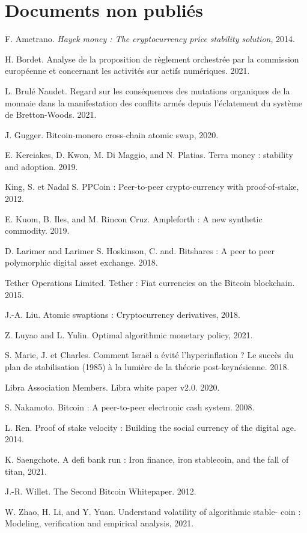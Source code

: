 {\section*{Documents non publiés}
F. Ametrano. \emph{Hayek money : The cryptocurrency price stability solution}, 2014.\par
H. Bordet. Analyse de la proposition de règlement orchestrée par la commission européenne et concernant les activités sur actifs numériques. 2021.\par
L. Brulé Naudet. Regard sur les conséquences des mutations organiques de la monnaie dans la manifestation des conflits armés depuis l'éclatement du système de Bretton-Woods. 2021.\par
J. Gugger. Bitcoin-monero cross-chain atomic swap, 2020.\par
E. Kereiakes, D. Kwon, M. Di Maggio, and N. Platias. Terra money : stability and adoption. 2019.\par
King, S. et Nadal S. PPCoin : Peer-to-peer crypto-currency with proof-of-stake, 2012.\par
E. Kuom, B. Iles, and M. Rincon Cruz. Ampleforth : A new synthetic commodity. 2019.\par
D. Larimer and Larimer S. Hoskinson, C. and. Bitshares : A peer to peer polymorphic digital asset exchange. 2018.\par
Tether Operations Limited. Tether : Fiat currencies on the Bitcoin blockchain. 2015.\par
J.-A. Liu. Atomic swaptions : Cryptocurrency derivatives, 2018.\par
Z. Luyao and L. Yulin. Optimal algorithmic monetary policy, 2021.\par
S. Marie, J. et Charles. Comment Israël a évité l'hyperinflation ? Le succès du plan de stabilisation (1985) à la lumière de la théorie post-keynésienne. 2018.\par
Libra Association Members. Libra white paper v2.0. 2020.\par
S. Nakamoto. Bitcoin : A peer-to-peer electronic cash system. 2008.\par
L. Ren. Proof of stake velocity : Building the social currency of the digital age. 2014.\par
K. Saengchote. A defi bank run : Iron finance, iron stablecoin, and the fall of titan, 2021.\par
J.-R. Willet. The Second Bitcoin Whitepaper. 2012.\par
W. Zhao, H. Li, and Y. Yuan. Understand volatility of algorithmic stable- coin : Modeling, verification and empirical analysis, 2021.\par

}
